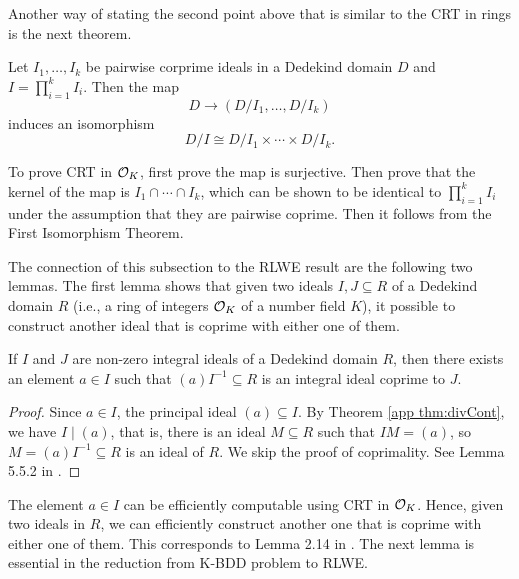 \documentclass[../main.tex]{subfiles}
\begin{document}
Another way of stating the second point above that is similar to the CRT in rings is the next theorem.

\begin{theorem}
   Let $I_1, \dots, I_k$ be pairwise corprime ideals in a Dedekind domain $D$ and $I = \prod_{i=1}^k I_i$. Then the map 
   \begin{equation*}
       D \rightarrow (D / I_1, \dots, D/I_k)
   \end{equation*}
   induces an isomorphism 
   \begin{equation*}
       D / I \cong D / I_1 \times \cdots \times D / I_k.
   \end{equation*}
\end{theorem}

To prove CRT in $\mathcal{O}_K$, first prove the map is surjective. Then prove that the kernel of the map is $I_1 \cap \cdots \cap I_k$, which can be shown to be identical to $\prod_{i=1}^k I_i$ under the assumption that they are pairwise coprime. Then it follows from the First Isomorphism Theorem. 

The connection of this subsection to the RLWE result are the following two lemmas. The first lemma shows that given two ideals $I, J \subseteq R$ of a Dedekind domain $R$ (i.e., a ring of integers $\mathcal{O}_K$ of a number field $K$), it possible to construct another ideal that is coprime with either one of them. 

\begin{lemma}
\label{app lm:coprimeIdeals}
If $I$ and $J$ are non-zero integral ideals of a Dedekind domain $R$, then there exists an element $a \in I$ such that $(a)I^{-1} \subseteq R$ is an integral ideal coprime to $J$. 
\end{lemma}

\begin{proof}
Since $a \in I$, the principal ideal $(a) \subseteq I$. By Theorem \ref{app thm:divCont}, we have $I \mid (a)$, that is, there is an ideal $M \subseteq R$ such that $IM=(a)$, so $M=(a)I^{-1} \subseteq R$ is an ideal of $R$. We skip the proof of coprimality. %
See Lemma 5.5.2 in \cite{stein2012algebraic}.
\end{proof}

The element $a \in I$ can be efficiently computable using CRT in $\mathcal{O}_K$. Hence, given two ideals in $R$, we can efficiently construct another one that is coprime with either one of them. This corresponds to Lemma 2.14 in \cite{lyubashevsky2010ideal}. The next lemma is essential in the reduction from K-BDD problem to RLWE. 
\end{document}
